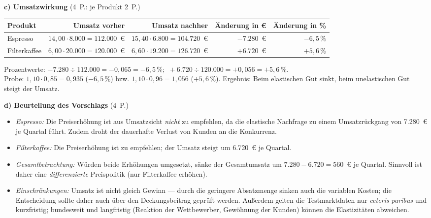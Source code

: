 \begin{loesung}[title={Lösung Aufgabe~1.3 --- Preiselastizität und Umsatzwirkung}]
\textbf{c) Umsatzwirkung} \hfill (4~P.: je Produkt 2~P.)

\begin{center}
\small
\begin{tabular}{l r r r r}
\toprule
\rowcolor{bfwTabHead}
\textbf{Produkt} & \textbf{Umsatz vorher} & \textbf{Umsatz nachher} & \textbf{Änderung in €} & \textbf{Änderung in \%}\\
\midrule
Espresso & $14{,}00 \cdot 8.000 = 112.000$~€ & $15{,}40 \cdot 6.800 = 104.720$~€ & $-7.280$~€ & $-6{,}5\,\%$\\
Filterkaffee & $6{,}00 \cdot 20.000 = 120.000$~€ & $6{,}60 \cdot 19.200 = 126.720$~€ & $+6.720$~€ & $+5{,}6\,\%$\\
\bottomrule
\end{tabular}
\end{center}
Prozentwerte: $-7.280 \div 112.000 = -0{,}065 = -6{,}5\,\%$;
$\ +6.720 \div 120.000 = +0{,}056 = +5{,}6\,\%$.\\
Probe: $1{,}10 \cdot 0{,}85 = 0{,}935$ ($-6{,}5\,\%$) bzw. $1{,}10 \cdot 0{,}96 = 1{,}056$
($+5{,}6\,\%$). Ergebnis: Beim elastischen Gut sinkt, beim unelastischen Gut steigt der
Umsatz.

\textbf{d) Beurteilung des Vorschlags} \hfill (4~P.)
\begin{itemize}
  \item \emph{Espresso:} Die Preiserhöhung ist aus Umsatzsicht \emph{nicht} zu empfehlen,
    da die elastische Nachfrage zu einem Umsatzrückgang von 7.280~€ je Quartal führt.
    Zudem droht der dauerhafte Verlust von Kunden an die Konkurrenz.
  \item \emph{Filterkaffee:} Die Preiserhöhung ist zu empfehlen; der Umsatz steigt um
    6.720~€ je Quartal.
  \item \emph{Gesamtbetrachtung:} Würden beide Erhöhungen umgesetzt, sänke der
    Gesamtumsatz um $7.280 - 6.720 = 560$~€ je Quartal. Sinnvoll ist daher eine
    \emph{differenzierte} Preispolitik (nur Filterkaffee erhöhen).
  \item \emph{Einschränkungen:} Umsatz ist nicht gleich Gewinn --- durch die geringere
    Absatzmenge sinken auch die variablen Kosten; die Entscheidung sollte daher auch über
    den Deckungsbeitrag geprüft werden. Außerdem gelten die Testmarktdaten nur
    \emph{ceteris paribus} und kurzfristig; bundesweit und langfristig (Reaktion der
    Wettbewerber, Gewöhnung der Kunden) können die Elastizitäten abweichen.
\end{itemize}
\end{loesung}

